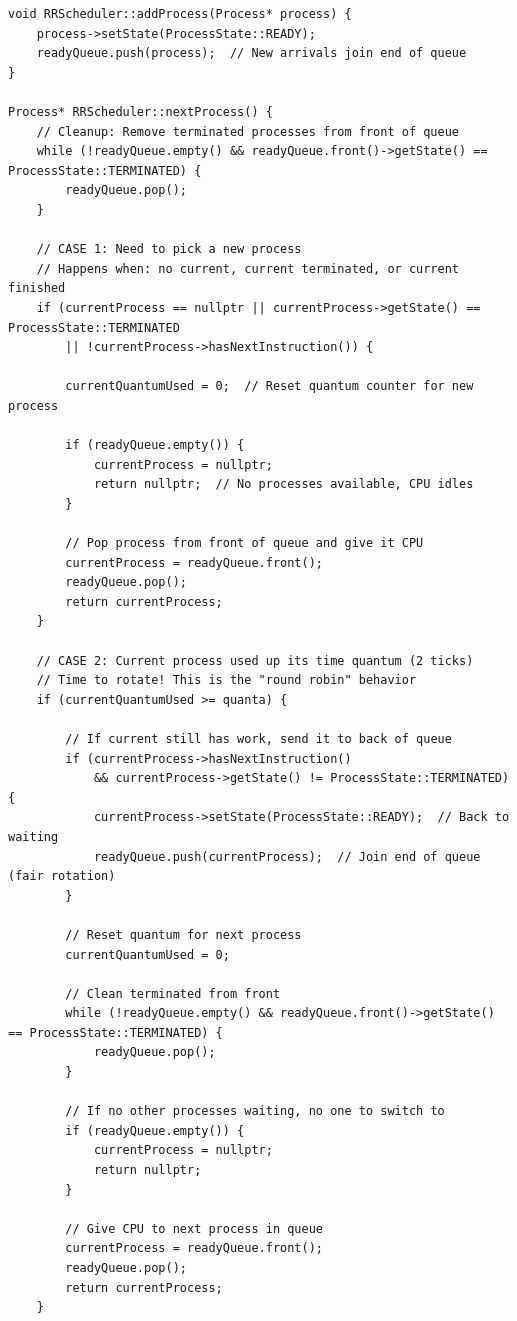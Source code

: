 \documentclass[a4paper,10pt,oneside]{article}
\begin{document}
\begin{multicols*}{\COLS}
\begin{lstlisting}
void RRScheduler::addProcess(Process* process) {
    process->setState(ProcessState::READY);
    readyQueue.push(process);  // New arrivals join end of queue
}

Process* RRScheduler::nextProcess() {
    // Cleanup: Remove terminated processes from front of queue
    while (!readyQueue.empty() && readyQueue.front()->getState() == ProcessState::TERMINATED) {
        readyQueue.pop();
    }

    // CASE 1: Need to pick a new process
    // Happens when: no current, current terminated, or current finished
    if (currentProcess == nullptr || currentProcess->getState() == ProcessState::TERMINATED 
        || !currentProcess->hasNextInstruction()) {
        
        currentQuantumUsed = 0;  // Reset quantum counter for new process
        
        if (readyQueue.empty()) {
            currentProcess = nullptr;
            return nullptr;  // No processes available, CPU idles
        }
        
        // Pop process from front of queue and give it CPU
        currentProcess = readyQueue.front();
        readyQueue.pop();
        return currentProcess;
    }

    // CASE 2: Current process used up its time quantum (2 ticks)
    // Time to rotate! This is the "round robin" behavior
    if (currentQuantumUsed >= quanta) {
        
        // If current still has work, send it to back of queue
        if (currentProcess->hasNextInstruction() 
            && currentProcess->getState() != ProcessState::TERMINATED) {
            currentProcess->setState(ProcessState::READY);  // Back to waiting
            readyQueue.push(currentProcess);  // Join end of queue (fair rotation)
        }
        
        // Reset quantum for next process
        currentQuantumUsed = 0;
        
        // Clean terminated from front
        while (!readyQueue.empty() && readyQueue.front()->getState() == ProcessState::TERMINATED) {
            readyQueue.pop();
        }
        
        // If no other processes waiting, no one to switch to
        if (readyQueue.empty()) {
            currentProcess = nullptr;
            return nullptr;
        }
        
        // Give CPU to next process in queue
        currentProcess = readyQueue.front();
        readyQueue.pop();
        return currentProcess;
    }


\end{lstlisting}
\end{multicols*}
\end{document}
